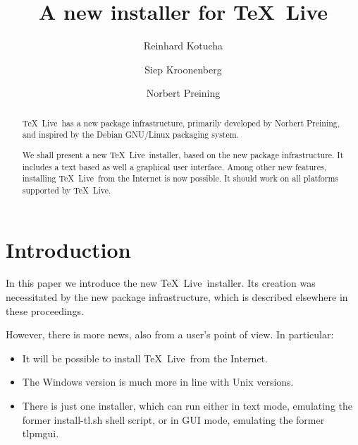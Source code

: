 \documentclass{ltugproc}
\newcommand{\tl}{\TeX~Live}
\begin{document}

\title{A new installer for \tl}%

\author{Reinhard Kotucha}
\address{Marschnerstr.~25\\
	30167~Hannover, Germany}

\author{Siep Kroonenberg}
\address{Rijksuniversiteit Groningen\\
	Department of Economics\\
        P.O.~Box~800\\
	9700~AV~Groningen, the Netherlands}

\author{Norbert Preining}
\address{Vienna University of Technology\\
	Wiedner Hauptstr.\ 10\\
	1040 Wien, Austria}


\begin{abstract}
  \tl\ has a new package infrastructure, primarily developed by
  Norbert Preining, and inspired by the Debian GNU/Linux packaging
  system.

  We shall present a new \tl\ installer, based on the new package
  infrastructure. It includes a text based as well a graphical user
  interface.  Among other new features, installing \tl\ from the
  Internet is now possible. It should work on all platforms
  supported by \tl.
\end{abstract}

\maketitle

%

\section{Introduction}
\label{sec:intro}

In this paper we introduce the new \tl\ installer. Its creation was
necessitated by the new package infrastructure, which is described
elsewhere in these proceedings.

However, there is more news, also from a user's point of view. In
particular:
\begin{itemize}
\item It will be possible to install \tl\ from the Internet.
\item The Windows version is much more in line with Unix versions.
\item There is just one installer, which can run either in text
  mode, emulating the former install-tl.sh shell script,
  or in GUI mode, emulating the former tlpmgui.
\end{itemize}
\end{document}
